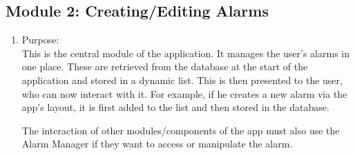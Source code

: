 \documentclass[conference]{IEEEtran}
\begin{document}
\subsection{Module 2: Creating/Editing Alarms}
\begin{enumerate}
    \item Purpose: \\
    This is the central module of the application. It manages the user's alarms in one place. These are retrieved from the database at the start of the application and stored in a dynamic list. This is then presented to the user, who can now interact with it. For example, if he creates a new alarm via the app's layout, it is first added to the list and then stored in the database. 
    \par The interaction of other modules/components of the app must also use the Alarm Manager if they want to access or manipulate the alarm.\\ 


\end{enumerate}
\end{document}
